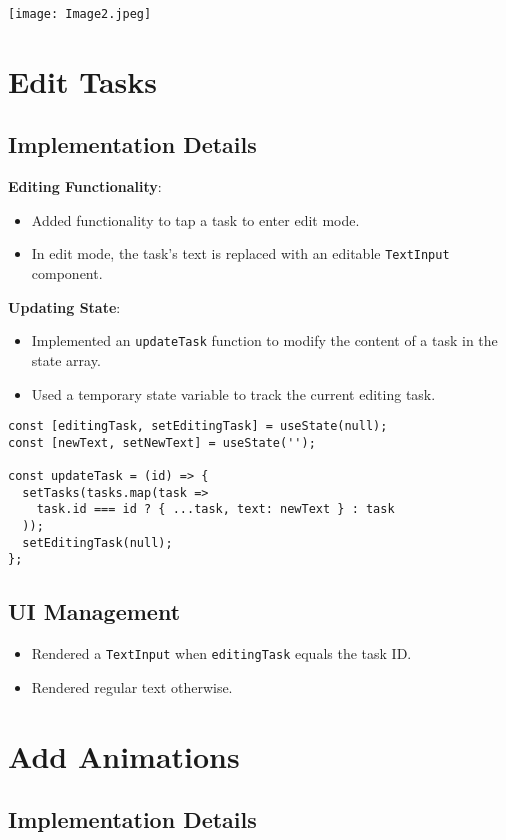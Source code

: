 \documentclass[12pt]{article}
\begin{document}
\texttt{[image: Image2.jpeg]}
\section{Edit Tasks }

\subsection{Implementation Details}

\textbf{Editing Functionality}:
\begin{itemize}
    \item Added functionality to tap a task to enter edit mode.
    \item In edit mode, the task’s text is replaced with an editable \texttt{TextInput} component.
\end{itemize}

\textbf{Updating State}:
\begin{itemize}
    \item Implemented an \texttt{updateTask} function to modify the content of a task in the state array.
    \item Used a temporary state variable to track the current editing task.
\end{itemize}


\begin{verbatim}
const [editingTask, setEditingTask] = useState(null);
const [newText, setNewText] = useState('');

const updateTask = (id) => {
  setTasks(tasks.map(task =>
    task.id === id ? { ...task, text: newText } : task
  ));
  setEditingTask(null);
};
\end{verbatim}

\subsection{UI Management}
\begin{itemize}
    \item Rendered a \texttt{TextInput} when \texttt{editingTask} equals the task ID.
    \item Rendered regular text otherwise.
\end{itemize}


\section{Add Animations }

\subsection{Implementation Details}
\end{document}
